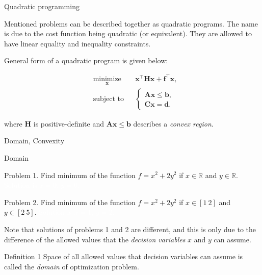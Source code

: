 \documentclass{beamer}
\begin{document}
\begin{frame}{Quadratic programming}
\begin{flushleft}

Mentioned problems can be described together as quadratic programs. The name is due to the cost function being quadratic (or equivalent). They are allowed to have linear equality and inequality constraints. 

\bigskip

General form of a quadratic program is given below:

%
\begin{equation}
\begin{aligned}
& \underset{\mathbf{x}}{\text{minimize}}
& & \mathbf{x}^\top \mathbf{H} \mathbf{x} + \mathbf{f}^\top\mathbf{x}, \\
& \text{subject to}
& & \begin{cases}
    \mathbf{A}\mathbf{x} \leq \mathbf{b}, \\
    \mathbf{C}\mathbf{x} = \mathbf{d}.
    \end{cases}
\end{aligned}
\end{equation}

where $\mathbf{H}$ is positive-definite and $\mathbf{A}\mathbf{x} \leq \mathbf{b}$ describes a \emph{convex region}.

\end{flushleft}
\end{frame}




\begin{frame}
	\centerline{\huge Domain, Convexity}
\end{frame}



\begin{frame}{Domain}
	\begin{flushleft}
		
		Problem 1. Find minimum of the function $f = x^2 + 2y^2$ if $x \in \mathbb{R}$ and $y \in \mathbb{R}$. \textcolor{white}{Solution is $x = 0$, $y = 0$.}
		
		\bigskip
		
		Problem 2. Find minimum of the function $f = x^2 + 2y^2$ if $x \in [1 \ 2]$ and $y \in [2 \ 5]$. \textcolor{white}{Solution is $x = 1$, $y = 2$.}
		
		\bigskip
		
		Note that solutions of problems 1 and 2 are different, and this is only due to the difference of the allowed values that the \emph{decision variables} $x$ and $y$ can assume.
		
		\begin{block}{Definition 1}
			Space of all allowed values that decision variables can assume is called the \emph{domain} of optimization problem.
		\end{block}
		
	\end{flushleft}
\end{frame}
\end{document}
